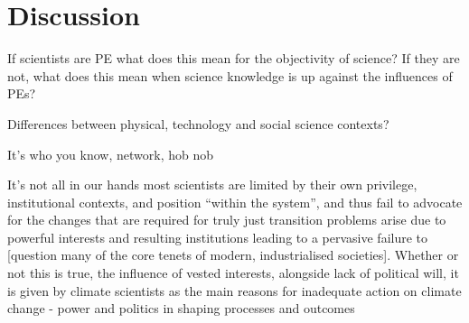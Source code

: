 \chapter{Discussion}\label{ch:discussion}

If scientists are PE what does this mean for the objectivity of science?
If they are not, what does this mean when science knowledge is up against the influences of PEs?

Differences between physical, technology and social science contexts?

It's who you know, network, hob nob

It's not all in our hands
\cite{Bendell2024} most scientists are limited by their own privilege, institutional contexts, and position ``within the system'', and thus fail to advocate for the changes that are required for truly just transition  
\cite{StoddardEtAl2021} problems arise due to powerful interests and resulting institutions leading to a pervasive failure to [question many of the core tenets of modern, industrialised societies]. Whether or not this is true, the influence of vested interests, alongside lack of political will, it is given by climate scientists as the main reasons for inadequate action on climate change \cite{Carrington2024} 
\cite{TurnhoutMWKL2020} - power and politics in shaping processes and outcomes

